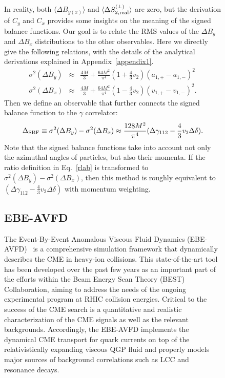\begin{figure}[htbp]
In reality, both $\langle\Delta B_{y(x)}\rangle$
and $\langle \Delta S_{2,\rm real}^{(\perp)}\rangle$ are zero,
but the derivation of $C_y$ and $C_x$ provides some insights on the meaning of the signed balance functions.
Our goal is to relate the RMS values of the $\Delta B_y$ and $\Delta B_x$ distributions to 
the other observables.
Here we directly give the following relations, with the details of the analytical derivations explained in Appendix~\ref{appendix1}.
\begin{eqnarray}
\sigma^2(\Delta B_y) &\approx& \frac{4M}{3}+ \frac{64M^2}{\pi^4}(1+ \frac{4}{3} v_2)(a_{1,+}-a_{1,-})^2 
\\
\sigma^2(\Delta B_x) &\approx& \frac{4M}{3}+ \frac{64M^2}{\pi^4}(1-\frac{4}{3}v_2)(v_{1,+}-v_{1,-})^2 .
\end{eqnarray}
Then we define an observable that further connects the signed balance function to the $\gamma$ correlator:
\begin{equation}
\Delta_{\rm SBF} \equiv \sigma^2(\Delta B_y) - \sigma^2(\Delta B_x) \approx  \frac{128M^2}{\pi^4}(\Delta\gamma_{112}-\frac{4}{3}v_2\Delta\delta).   \label{eq:relation3} 
\end{equation}
Note that the signed balance functions take into account not only the azimuthal angles of particles, but also their momenta. 
If the ratio definition in Eq.~\ref{rlab} is transformed to $\sigma^2(\Delta B_y) - \sigma^2({\Delta B_x})$, then this method is roughly equivalent to $(\Delta \gamma_{112}-\frac{4}{3}v_2\Delta\delta)$ with momentum weighting.








\subsection{EBE-AVFD~\cite{Wang:2018ygc}}  

The Event-By-Event Anomalous Viscous Fluid Dynamics (EBE-AVFD)~\cite{Shi:2017cpu,Jiang:2016wve,Shi:2019wzi} is a comprehensive simulation framework that dynamically describes  the CME in heavy-ion collisions. This state-of-the-art tool has been developed over the past few years as an important part of the  efforts within the Beam Energy Scan Theory (BEST) Collaboration, aiming to address the needs of the ongoing experimental program at RHIC collision energies.   Critical to the success of the CME search is a quantitative and realistic characterization of the CME signals as well as the relevant backgrounds. Accordingly, the EBE-AVFD  implements the dynamical CME transport for quark currents on top of the relativistically expanding viscous QGP fluid and properly models   major sources of background correlations such as LCC and resonance decays.  


\end{figure}
